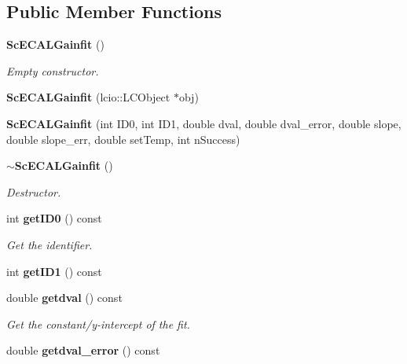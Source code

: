 \subsection*{Public Member Functions}
\begin{DoxyCompactItemize}
\item 
{\bf Sc\-E\-C\-A\-L\-Gainfit} ()\label{classCALICE_1_1ScECALGainfit_a2639beb8f091502e3e0e141b4bb33325}

\begin{DoxyCompactList}\small\item\em Empty constructor. \end{DoxyCompactList}\item 
{\bfseries Sc\-E\-C\-A\-L\-Gainfit} (lcio\-::\-L\-C\-Object $\ast$obj)\label{classCALICE_1_1ScECALGainfit_a8582a6afd710d87eeb8c9c10ddda2378}

\item 
{\bfseries Sc\-E\-C\-A\-L\-Gainfit} (int I\-D0, int I\-D1, double dval, double dval\-\_\-error, double slope, double slope\-\_\-err, double set\-Temp, int n\-Success)\label{classCALICE_1_1ScECALGainfit_a04407be016e0b1208fe4e5e76adab9a6}

\item 
{\bf $\sim$\-Sc\-E\-C\-A\-L\-Gainfit} ()\label{classCALICE_1_1ScECALGainfit_a3297c9edfe996e4636a7cdaef7d5e67a}

\begin{DoxyCompactList}\small\item\em Destructor. \end{DoxyCompactList}\item 
int {\bf get\-I\-D0} () const \label{classCALICE_1_1ScECALGainfit_a640f7d099b60984b8ac0fb0dc2d6b0a7}

\begin{DoxyCompactList}\small\item\em Get the identifier. \end{DoxyCompactList}\item 
int {\bfseries get\-I\-D1} () const \label{classCALICE_1_1ScECALGainfit_abe61b66827315a318e751f96e074caf3}

\item 
double {\bf getdval} () const \label{classCALICE_1_1ScECALGainfit_af6fbc63a9a982f7b560e5a71b51550ce}

\begin{DoxyCompactList}\small\item\em Get the constant/y-\/intercept of the fit. \end{DoxyCompactList}\item 
double {\bf getdval\-\_\-error} () const \label{classCALICE_1_1ScECALGainfit_a477f830e6432cf59df7c29dfa723599f}


\end{DoxyCompactItemize}
